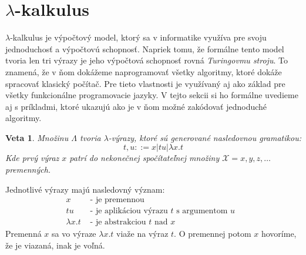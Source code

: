 \documentclass[a4paper,10pt,oneside]{report}%
\newtheorem{theorem}{Veta}[chapter]
\begin{document}
\section{$\lambda$-kalkulus}
    $\lambda$-kalkulus je výpočtový model, ktorý sa v informatike využíva pre svoju
jednoduchosť a výpočtovú schopnosť.
    Napriek tomu, že formálne tento model tvoria len tri výrazy je jeho výpočtová
schopnosť rovná \emph{Turingovmu stroju}.
    To znamená, že v ňom dokážeme naprogramovať všetky algoritmy, ktoré dokáže
spracovať klasický počítač.
    Pre tieto vlastnosti je využívaný aj ako základ pre všetky funkcionálne programovacie
jazyky.
    V tejto sekcii si ho formálne uvedieme aj s príkladmi, ktoré ukazujú ako je
v ňom možné zakódovať jednoduché algoritmy.

\begin{theorem}
    Množinu $\Lambda$ tvoria $\lambda$-výrazy, ktoré sú generované nasledovnou gramatikou:
    \begin{equation}
        t, u ::= x | t u | \lambda x.t
    \end{equation}
    Kde prvý výraz $x$ patrí do nekonečnej spočítateľnej množiny $\mathcal{X}={x,y,z,\dots}$
premenných.
\end{theorem}
    Jednotlivé výrazy majú nasledovný význam:
\begin{align*}
     x          & \textrm{ - je premennou }\\
     t u        & \textrm{ - je aplikáciou výrazu $t$ s argumentom $u$ }\\
    \lambda x.t & \textrm{ - je abstrakciou $t$ nad $x$ }
\end{align*}
    Premenná $x$ sa vo výraze $\lambda x . t$ viaže na výraz $t$. O premennej potom
$x$ hovoríme, že je viazaná, inak je voľná.
\end{document}
